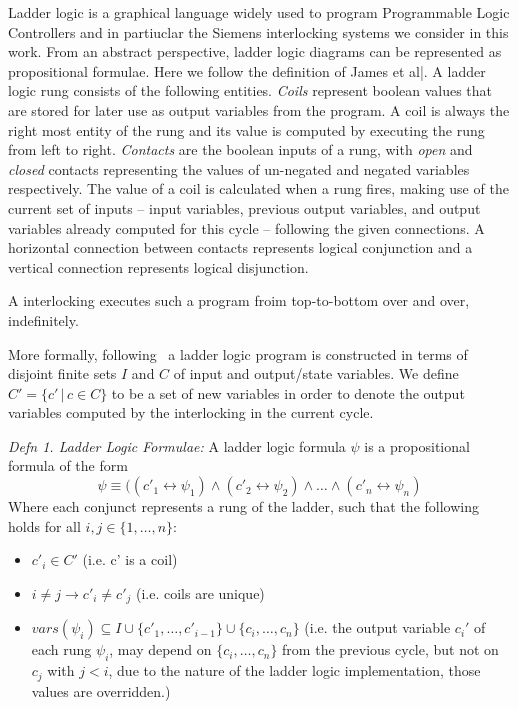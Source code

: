 \documentclass[conference,compsoc]{IEEEtran}
\begin{document}
Ladder logic is a graphical language widely used to program Programmable Logic Controllers\cite{IECstandard} and in partiuclar the Siemens interlocking systems we consider in this work. From an abstract perspective, ladder logic diagrams can be represented as
propositional formulae. Here we follow the definition of James et al|\cite{sefm14}. A ladder logic rung consists of the following entities.
\emph{Coils}
represent boolean values that are stored for later use as output
variables from the program. A coil is always the right most entity
of the rung and its value is computed by executing the rung from left
to right.
\emph{Contacts} are the boolean inputs of a rung,
with \emph{open} and \emph{closed} contacts representing the values
of un-negated and negated variables respectively.  The value of a coil
is calculated when a rung fires, making use of the current set of
inputs -- input variables, previous output variables,
and output variables already computed for this cycle --
following the given connections.  A horizontal connection between
contacts represents logical conjunction and a vertical connection
represents logical disjunction.

A interlocking executes such a program froim top-to-bottom over and over, indefinitely.

More formally, following~\cite{sefm14} a ladder logic program is constructed in terms of disjoint finite sets
$I$ and $C$ of input and output/state variables. We define $C' = \{ c' \, | \, c \in C \}$ to be a set of new variables
in order to denote the output variables computed by the interlocking in the current
cycle.

\textit{Defn 1. Ladder Logic Formulae:}
A ladder logic formula $\psi$ is a propositional formula of the form
$$\psi \equiv ((c'_1 \leftrightarrow \psi_1) \wedge (c'_2 \leftrightarrow
\psi_2) \wedge  \ldots \wedge (c'_n \leftrightarrow \psi_n)$$ 
Where each conjunct represents a rung of the ladder,
such that the following holds for all $i,j\in \{1,\ldots,n\}$:
\begin{itemize}
\item $c'_i \in C'$ (i.e. c' is a coil)
\item $i \neq j \rightarrow c'_i \neq c'_j$ (i.e. coils are unique)
\item $vars(\psi_i) \subseteq I \cup  \{c'_1, \ldots, c'_{i-1} \} \cup \{ c_i, \ldots , c_n \}$ (i.e. the output variable $c_i'$ of  each rung $\psi_i$, may depend on  $\{ c_i, \ldots , c_n \}$ from the previous cycle, 
but not on $c_j$ with $j<i$, due to the nature of the ladder logic implementation,
those values are overridden.)
\end{itemize}
\end{document}

